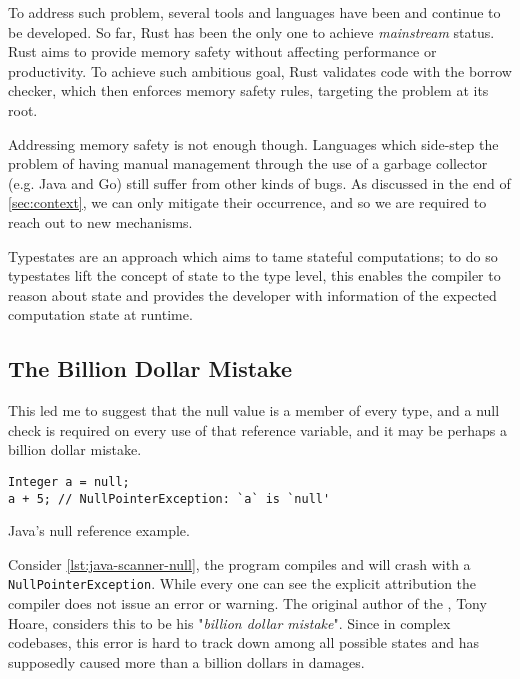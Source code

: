 To address such problem, several tools and languages have been and continue to be developed.
So far, Rust has been the only one to achieve \emph{mainstream} status.
Rust aims to provide memory safety without affecting performance or productivity.
To achieve such ambitious goal, Rust validates code with the borrow checker, which then enforces memory safety rules,
targeting the problem at its root.

Addressing memory safety is not enough though.
Languages which side-step the problem of having manual management
through the use of a garbage collector (e.g. Java and Go) still suffer from other kinds of bugs.
As discussed in the end of \autoref{sec:context}, we can only mitigate their occurrence, and
so we are required to reach out to new mechanisms.

Typestates are an approach which aims to tame stateful computations;
to do so typestates lift the concept of state to the type level,
this enables the compiler to reason about state and provides the developer
with information of the expected computation state at runtime.

\subsection{The Billion Dollar Mistake}

\begin{displayquote}
    This led me to suggest that the null value is a member of every type,
    and a null check is required on every use of that reference variable,
    and it may be perhaps a billion dollar mistake.
\end{displayquote}

\begin{listing}
    \begin{verbatim}
Integer a = null;
a + 5; // NullPointerException: `a` is `null'
    \end{verbatim}
    \caption{Java's null reference example.}
    \label{lst:java-scanner-null}
\end{listing}

Consider \autoref{lst:java-scanner-null}, the program compiles and will crash with a \texttt{NullPointerException}.
While every one can see the explicit  attribution the compiler does not issue an error or warning.
The original author of the , Tony Hoare, considers this to be his "\emph{billion dollar mistake}".
Since in complex codebases, this error is hard to track down among all possible states and
has supposedly caused more than a billion dollars in damages.

